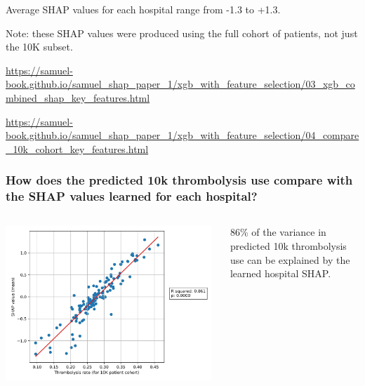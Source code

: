 \documentclass[xcolor={usenames,dvipsnames}]{beamer}
\newcommand{\smallurl}[1]{\textcolor{blue}{\fontsize{4pt}{4.8pt}\selectfont \url{#1}}}
\begin{document}
\begin{frame}
\begin{columns}
\end{columns} 

Average SHAP values for each hospital range from -1.3 to +1.3.

\vspace{1em}
\footnotesize{Note: these SHAP values were produced using the full cohort of patients, not just the 10K subset.}

\smallurl{https://samuel-book.github.io/samuel_shap_paper_1/xgb_with_feature_selection/03_xgb_combined_shap_key_features.html}

\smallurl{https://samuel-book.github.io/samuel_shap_paper_1/xgb_with_feature_selection/04_compare_10k_cohort_key_features.html}


\end{frame}



\begin{frame}
\frametitle{How does the predicted 10k thrombolysis use compare with the SHAP values learned for each hospital?}

\begin{columns}
    \begin{center} 
    \includegraphics[width=0.98\textwidth]{./images/rsquared_shap_predicted_thrombolysis}
    \end{center} 
    
    
    {\footnotesize
    86\% of the variance in predicted
    10k thrombolysis use can be
    explained by the learned hospital
    SHAP.}
\end{columns}


\end{frame}
\end{document}
